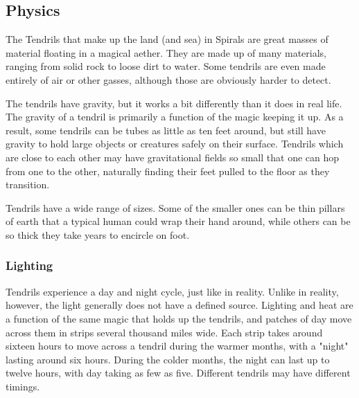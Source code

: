 \begin{multicols*}{2}
\subsection{Physics}
The Tendrils that make up the land (and sea) in Spirals are great masses of material floating in a magical aether.
They are made up of many materials, ranging from solid rock to loose dirt to water.
Some tendrils are even made entirely of air or other gasses, although those are obviously harder to detect.

The tendrils have gravity, but it works a bit differently than it does in real life.
The gravity of a tendril is primarily a function of the magic keeping it up.
As a result, some tendrils can be tubes as little as ten feet around, but still have gravity to hold large objects or creatures safely on their surface.
Tendrils which are close to each other may have gravitational fields so small that one can hop from one to the other, naturally finding their feet pulled to the floor as they transition.

Tendrils have a wide range of sizes. 
Some of the smaller ones can be thin pillars of earth that a typical human could wrap their hand around, while others can be so thick they take years to encircle on foot.

\subsubsection*{Lighting}
Tendrils experience a day and night cycle, just like in reality.
Unlike in reality, however, the light generally does not have a defined source.
Lighting and heat are a function of the same magic that holds up the tendrils, and patches of day move across them in strips several thousand miles wide.
Each strip takes around sixteen hours to move across a tendril during the warmer months, with a "night" lasting around six hours.
During the colder months, the night can last up to twelve hours, with day taking as few as five.
Different tendrils may have different timings.


\end{multicols*}
